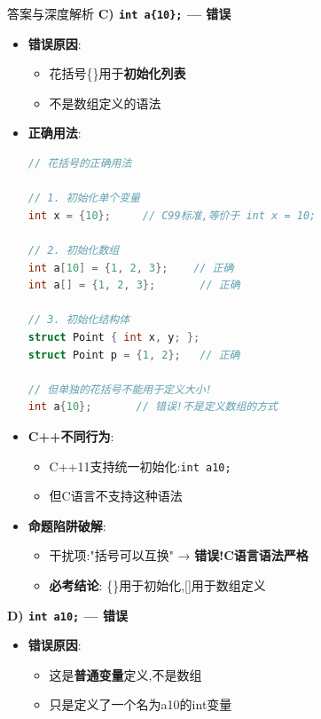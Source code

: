\documentclass[a4paper,12pt]{article}
\begin{document}
\begin{bluebox}{答案与深度解析}
	\textbf{C) \texttt{int a\{10\};} — 错误}
	\begin{itemize}[leftmargin=*, nosep]
		\item \textbf{错误原因}:
		      \begin{itemize}
			      \item 花括号\{\}用于\textbf{初始化列表}
			      \item 不是数组定义的语法
		      \end{itemize}

		\item \textbf{正确用法}:
		      \begin{lstlisting}[language=C]
// 花括号的正确用法

// 1. 初始化单个变量
int x = {10};     // C99标准,等价于 int x = 10;

// 2. 初始化数组
int a[10] = {1, 2, 3};    // 正确
int a[] = {1, 2, 3};       // 正确

// 3. 初始化结构体
struct Point { int x, y; };
struct Point p = {1, 2};   // 正确

// 但单独的花括号不能用于定义大小!
int a{10};       // 错误!不是定义数组的方式
    \end{lstlisting}

		\item \textbf{C++不同行为}:
		      \begin{itemize}
			      \item C++11支持统一初始化:\texttt{int a{10};}
			      \item 但C语言不支持这种语法
		      \end{itemize}

		\item \textbf{命题陷阱破解}:
		      \begin{itemize}
			      \item 干扰项:"括号可以互换" → \textbf{错误!C语言语法严格}
			      \item \textbf{必考结论}: \{\}用于初始化,[]用于数组定义
		      \end{itemize}
	\end{itemize}

	\textbf{D) \texttt{int a10;} — 错误}
	\begin{itemize}[leftmargin=*, nosep]
		\item \textbf{错误原因}:
		      \begin{itemize}
			      \item 这是\textbf{普通变量}定义,不是数组
			      \item 只是定义了一个名为a10的int变量
		      \end{itemize}


\end{itemize}
\end{bluebox}
\end{document}
